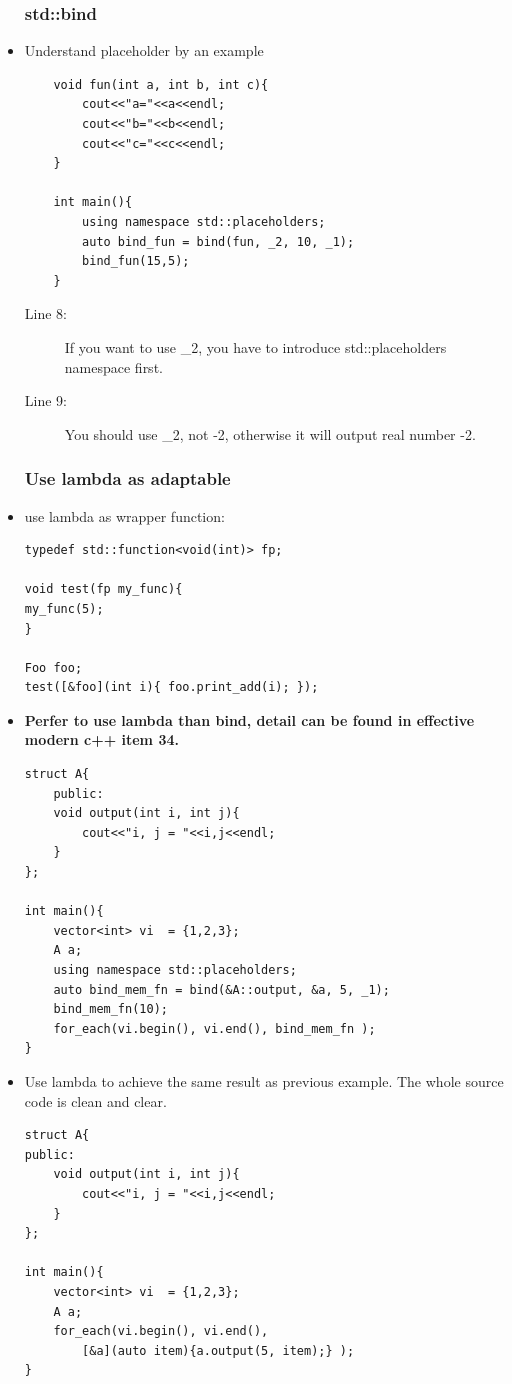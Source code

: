 \documentclass[a4paper,11pt,twoside]{book}
\begin{document}
\begin{itemize}
\subsubsection{std::bind}

	\item Understand placeholder by an example
\begin{lstlisting}
	void fun(int a, int b, int c){
		cout<<"a="<<a<<endl;
		cout<<"b="<<b<<endl;
		cout<<"c="<<c<<endl;
	}
	
	int main(){
		using namespace std::placeholders;
		auto bind_fun = bind(fun, _2, 10, _1);
		bind_fun(15,5);
	}
\end{lstlisting}
\begin{description}
	\item[Line 8:] If you want to use \_2, you have to introduce std::placeholders namespace first.
	\item[Line 9:] You should use \_2, not -2, otherwise it will output real number -2.
\end{description}
	

\subsubsection{Use lambda as adaptable}
	\item use lambda as wrapper function:
\begin{lstlisting}[numbers=none]
typedef std::function<void(int)> fp;

void test(fp my_func){
my_func(5);
}

Foo foo;
test([&foo](int i){ foo.print_add(i); });
\end{lstlisting}
	
	\item \textbf{Perfer to use lambda than bind, detail can be found in effective modern c++ item 34.}

\begin{lstlisting}
struct A{
	public:
	void output(int i, int j){
		cout<<"i, j = "<<i,j<<endl;
	}
};

int main(){
	vector<int> vi  = {1,2,3};
	A a;
	using namespace std::placeholders;
	auto bind_mem_fn = bind(&A::output, &a, 5, _1);
	bind_mem_fn(10);
	for_each(vi.begin(), vi.end(), bind_mem_fn );
}
\end{lstlisting}

\item Use lambda to achieve the same result as previous example. The whole source code is clean and clear. 
\begin{lstlisting}
struct A{
public:
	void output(int i, int j){
		cout<<"i, j = "<<i,j<<endl;
	}
};

int main(){
	vector<int> vi  = {1,2,3};
	A a;
	for_each(vi.begin(), vi.end(), 
		[&a](auto item){a.output(5, item);} );
}
\end{lstlisting}

\end{itemize}
\end{document}

